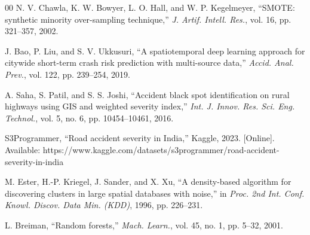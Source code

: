 \documentclass[conference]{IEEEtran}
\begin{document}
\begin{thebibliography}{00}
 N. V. Chawla, K. W. Bowyer, L. O. Hall, and W. P. Kegelmeyer, ``SMOTE: synthetic minority over-sampling technique,'' \textit{J. Artif. Intell. Res.}, vol. 16, pp. 321--357, 2002.

 J. Bao, P. Liu, and S. V. Ukkusuri, ``A spatiotemporal deep learning approach for citywide short-term crash risk prediction with multi-source data,'' \textit{Accid. Anal. Prev.}, vol. 122, pp. 239--254, 2019.

 A. Saha, S. Patil, and S. S. Joshi, ``Accident black spot identification on rural highways using GIS and weighted severity index,'' \textit{Int. J. Innov. Res. Sci. Eng. Technol.}, vol. 5, no. 6, pp. 10454--10461, 2016.

 S3Programmer, ``Road accident severity in India,'' Kaggle, 2023. [Online]. Available: https://www.kaggle.com/datasets/s3programmer/road-accident-severity-in-india

 M. Ester, H.-P. Kriegel, J. Sander, and X. Xu, ``A density-based algorithm for discovering clusters in large spatial databases with noise,'' in \textit{Proc. 2nd Int. Conf. Knowl. Discov. Data Min. (KDD)}, 1996, pp. 226--231.

 L. Breiman, ``Random forests,'' \textit{Mach. Learn.}, vol. 45, no. 1, pp. 5--32, 2001.

\end{thebibliography}
\end{document}
